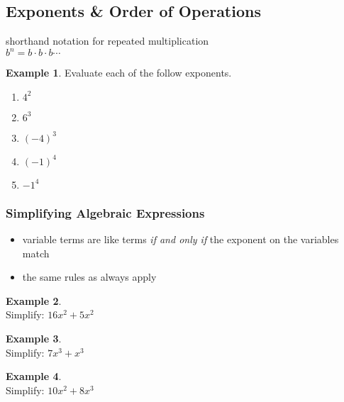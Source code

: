 \documentclass[addpoints,12pt]{exam}
\theoremstyle{definition}
\newtheorem{example}{Example}[subsection]
\begin{document}
\setcounter{section}{1}
\setcounter{subsection}{7}

\subsection{Exponents \& Order of Operations}

\vspace{.25in}

\begin{definition}[Exponentiation]
shorthand notation for repeated multiplication\\ $b^n = b\cdot b\cdot b\cdots$
\end{definition}

\vspace{.15in}

\begin{example}
Evaluate each of the follow exponents.
\begin{enumerate}
\item $4^2$
\item $6^3$
\item $(-4)^3$
\item $(-1)^4$
\item $-1^4$
\end{enumerate}
\end{example}

\vspace{.15in}

\subsubsection*{Simplifying Algebraic Expressions}
\begin{itemize}
\item variable terms are like terms \emph{if and only if} the exponent on the variables match
\item the same rules as always apply
\end{itemize}
\vspace{.15in}

\begin{minipage}{.33\textwidth}
\begin{example}\mbox{}\\
Simplify: $16x^2 + 5x^2$
\end{example}
\end{minipage}%
\begin{minipage}{.33\textwidth}
\begin{example}\mbox{}\\
Simplify: $7x^3 + x^3$
\end{example}
\end{minipage}%
\begin{minipage}{.33\textwidth}
\begin{example}\mbox{}\\
Simplify: $10x^2 + 8x^3$
\end{example}
\end{minipage}%
\end{document}
